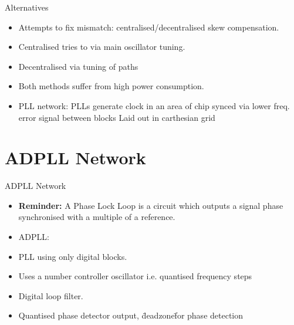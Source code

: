 \documentclass{beamer}
\begin{document}
\begin{frame}{Alternatives}

    \begin{itemize}
        \item
            Attempts to fix mismatch: centralised/decentralised skew compensation.
        \item
            Centralised tries to via main oscillator tuning.
        \item
            Decentralised via tuning of paths %
        \item
            Both methods suffer from high power consumption.
        \item
            PLL network:
            PLLs generate clock in an area of chip
            synced via lower freq. error signal between blocks
            Laid out in carthesian grid
        \end{itemize}
 
\end{frame}
\section*{ADPLL Network}

\begin{frame}{ADPLL Network}

    \begin{itemize}
        \item
            \textbf{Reminder:} A Phase Lock Loop is a circuit which outputs a signal phase synchronised with a multiple of a reference.
        \item
            ADPLL:
        \item
            PLL using only digital blocks.
        \item
            Uses a number controller oscillator i.e. quantised frequency steps
        \item
            Digital loop filter.
        \item
            Quantised phase detector output, \"deadzone\" for phase detection
    \end{itemize}
\end{frame}
\end{document}
